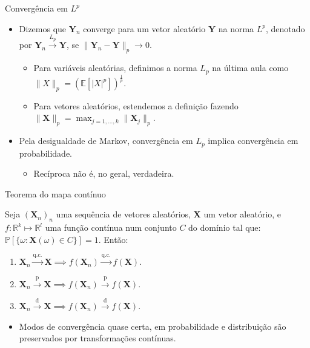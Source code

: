 \documentclass[11pt]{beamer}
\begin{document}
	\begin{frame}{Convergência em $L^p$}
		\begin{itemize}
			\item 		Dizemos que $\boldsymbol{Y}_n$ converge para um vetor aleatório $\boldsymbol{Y}$ na norma $L^p$, denotado por $\boldsymbol{Y}_n \overset{{L}_p}{\to} \boldsymbol{Y}$, se $\lVert  \boldsymbol{Y}_n -\boldsymbol{Y}\rVert_p \to 0$.
			\begin{itemize}
				\item Para variáveis aleatórias, definimos a norma $L_p$ na última aula como $\lVert X \rVert_p = \left(\mathbb{E}[|X|^p]\right)^{\frac{1}{p}}$.
				\item Para vetores aleatórios, estendemos a definição fazendo $\lVert \boldsymbol{X} \rVert_p = \max_{j=1,\ldots,k} \lVert \boldsymbol{X}_j\rVert_p$.
			\end{itemize}
			\item Pela desigualdade de Markov, convergência em $L_p$ implica convergência em probabilidade.
			\begin{itemize}
				\item Recíproca não é, no geral, verdadeira.
			\end{itemize} 
		\end{itemize}

	\end{frame}
	
	\begin{frame}{Teorema do mapa contínuo}
	\begin{theorem}
		Seja $(\boldsymbol{X}_n)_n$ uma sequência de vetores aleatórios, $\boldsymbol{X}$ um vetor aleatório, e $f:\mathbb{R}^k \mapsto \mathbb{R}^l$ uma função contínua num conjunto $C$ do domínio tal que:
		$\mathbb{P}[\{\omega:\boldsymbol{X}(\omega)\in C\}]=1$. Então:
		
		\begin{enumerate}
			\item $\boldsymbol{X}_n \overset{\text{q.c.}}{\to} \boldsymbol{X} \implies f(\boldsymbol{X}_n) \overset{\text{q.c.}}{\to} f(\boldsymbol{X} ) $.
			\item  $\boldsymbol{X}_n \overset{\text{p}}{\to} \boldsymbol{X} \implies f(\boldsymbol{X}_n) \overset{\text{p}}{\to} f(\boldsymbol{X} ) $.
			 \item $\boldsymbol{X}_n \overset{\text{d}}{\to} \boldsymbol{X} \implies f(\boldsymbol{X}_n) \overset{\text{d}}{\to} f(\boldsymbol{X} ) $.
		\end{enumerate}
	\end{theorem}
	\begin{itemize}
		\item Modos de convergência quase certa, em probabilidade e distribuição são preservados por transformações contínuas.
	\end{itemize}
	\end{frame}
	
\end{document}

